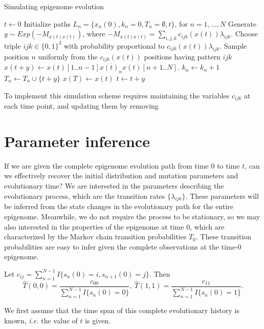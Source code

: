 \documentclass[11pt]{article}
\begin{document}
\begin{algorithm}[t]
\begin{algorithmic}[1]
  \caption{Simulating epigenome evolution}
  \STATE $t \leftarrow 0$
  \STATE Initialize paths $L_n = \{x_n(0), k_n=0, T_n=\emptyset, t\}$, for $n=1,\ldots, N$
  \STATE Generate $y\sim \mathit{Exp}(-M_{x(t)x(t)})$, where
  $-M_{x(t)x(t)} = \sum_{i,j,k}c_{ijk}(x(t))\lambda_{ijk}$.
  \STATE Choose triple $ijk \in \{0,1\}^3$ with probability proportional to $c_{ijk}(x(t))\lambda_{ijk}$.
  \STATE Sample position $n$ uniformly from the $c_{ijk}(x(t))$ positions having pattern $ijk$
  \STATE $x(t+y) \leftarrow x(t)[1..n-1]\overline{x(t)_n}x(t)[n+1..N]$.
  \STATE $k_n \leftarrow k_n + 1$ %
  \STATE $T_n \leftarrow T_n\cup \{t+y\}$
  \ELSE
  \STATE $x(T) \leftarrow x(t)$
  \ENDIF
  \STATE $t \leftarrow t+y$
  \ENDWHILE
\end{algorithmic}
\end{algorithm}

To implement this simulation scheme requires maintaining the variables
$c_{ijk}$ at each time point, and updating them by removing

\section{Parameter inference}

If we are given the complete epigenome evolution path from time $0$ to
time $t$, can we effectively recover the initial distribution and
mutation parameters and evolutionary time? We are interested in the
parameters describing the evolutionary process, which are the
transition rates $\{\lambda_{ijk}\}$. These parameters will be
inferred from the state changes in the evolutionary path for the
entire epigenome. Meanwhile, we do not require the process to be
stationary, so we may also interested in the properties of the
epigenome at time 0, which are characterized by the Markov chain
transition probabilities $T_{0}$. These transition probabilities are
easy to infer given the complete observations at the time-0 epigenome.

Let $c_{ij} = \sum_{n=1}^{N-1}I\{s_n(0) =i, s_{n+1}(0)=j\}$. Then
\[
\hat{T}(0, 0) = \frac{c_{00}}{\sum_{n=1}^{N-1}I\{s_n(0) = 0\}}, ~
\hat{T}(1,1) = \frac{c_{11}}{\sum_{n=1}^{N-1}I\{s_n(0) = 1\}}.
\]

We first assume that the time span of this complete evolutionary
history is known, \textit{i.e.} the value of $t$ is given.
\end{document}
